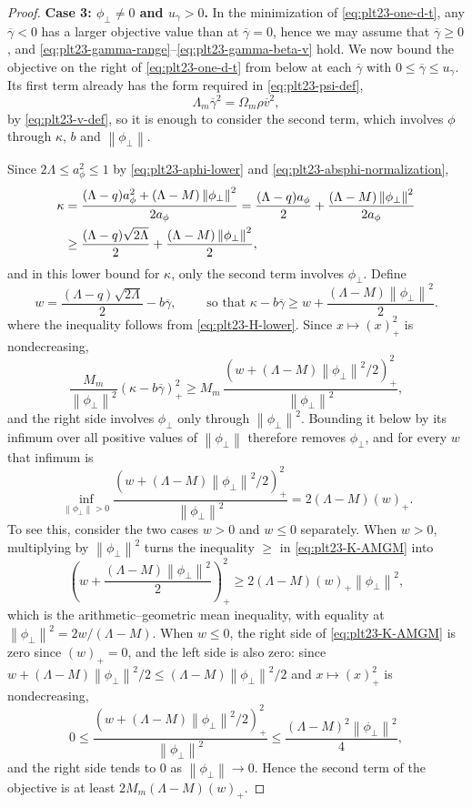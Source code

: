 ﻿\documentclass[11pt]{article}
\numberwithin{equation}{section}
\newcommand{\norm}[1]{\left\lVert #1\right\rVert}
\newcommand{\pos}[1]{\left(#1\right)_{+}}
\begin{document}
\begin{proof}
  \textbf{Case 3: $\phi_\perp\ne0$ and $u_\gamma>0$.}
  In the minimization of \eqref{eq:plt23-one-d-t}, any $\overline\gamma<0$ has a larger objective value than at $\overline\gamma=0$, hence we may assume that $\overline\gamma\ge0$, and \eqref{eq:plt23-gamma-range}--\eqref{eq:plt23-gamma-beta-v} hold.
  We now bound the objective on the right of \eqref{eq:plt23-one-d-t} from below at each $\overline\gamma$ with $0\le\overline\gamma\le u_\gamma$.
  Its first term already has the form required in \eqref{eq:plt23-psi-def},
  \[
    \Lambda_m\overline\gamma^2=\Omega_m\rho\overline v^2,
  \]
  by \eqref{eq:plt23-v-def}, so it is enough to consider the second term, which involves $\phi$ through $\kappa$, $b$ and $\norm{\phi_\perp}$.

  Since $2\Lambda\le a_\phi^2\le1$ by \eqref{eq:plt23-aphi-lower} and \eqref{eq:plt23-absphi-normalization},
  \begin{align}
    \kappa
    &=\frac{(\Lambda-q)a_\phi^2+(\Lambda-M)\norm{\phi_\perp}^2}{2a_\phi}
    =\frac{(\Lambda-q)a_\phi}{2}+\frac{(\Lambda-M)\norm{\phi_\perp}^2}{2a_\phi}\notag\\
    &\ge\frac{(\Lambda-q)\sqrt{2\Lambda}}{2}
    +\frac{(\Lambda-M)\norm{\phi_\perp}^2}{2},\label{eq:plt23-H-lower}
  \end{align}
  and in this lower bound for $\kappa$, only the second term involves $\phi_\perp$.
  Define
  \[
    w=\frac{(\Lambda-q)\sqrt{2\Lambda}}{2}-b\overline\gamma, \qquad \text{ so that } \kappa-b\overline\gamma\ge w+ \frac{(\Lambda-M)\norm{\phi_\perp}^2}{2}.
  \]
  where the inequality follows from \eqref{eq:plt23-H-lower}.
  Since $x\mapsto\pos x^2$ is nondecreasing,
  \[
    \frac{M_m}{\norm{\phi_\perp}^2}\pos{\kappa-b\overline\gamma}^2
    \ge M_m\,\frac{\pos{w+(\Lambda-M)\norm{\phi_\perp}^2/2}^2}{\norm{\phi_\perp}^2},
  \]
  and the right side involves $\phi_\perp$ only through $\norm{\phi_\perp}^2$.
  Bounding it below by its infimum over all positive values of $\norm{\phi_\perp}$ therefore removes $\phi_\perp$, and for every $w$ that infimum is
  \begin{equation}\label{eq:plt23-K-AMGM}
    \inf_{\norm{\phi_\perp}>0}
    \frac{\pos{w+(\Lambda-M)\norm{\phi_\perp}^2/2}^2}{\norm{\phi_\perp}^2}
    =2(\Lambda-M)\pos w.
  \end{equation}
  To see this, consider the two cases $w>0$ and $w\le0$ separately.
  When $w>0$, multiplying by $\norm{\phi_\perp}^2$ turns the inequality $\ge$ in \eqref{eq:plt23-K-AMGM} into
  \[
    \pos{w+\frac{(\Lambda-M)\norm{\phi_\perp}^2}{2}}^2
    \ge2(\Lambda-M)\pos w\norm{\phi_\perp}^2,
  \]
  which is the arithmetic--geometric mean inequality, with equality at $\norm{\phi_\perp}^2=2w/(\Lambda-M)$.
  When $w\le0$, the right side of \eqref{eq:plt23-K-AMGM} is zero since $\pos w=0$, and the left side is also zero: since $w+(\Lambda-M)\norm{\phi_\perp}^2/2\le(\Lambda-M)\norm{\phi_\perp}^2/2$ and $x\mapsto\pos x^2$ is nondecreasing,
  \[
    0\le\frac{\pos{w+(\Lambda-M)\norm{\phi_\perp}^2/2}^2}{\norm{\phi_\perp}^2}
    \le\frac{(\Lambda-M)^2\norm{\phi_\perp}^2}{4},
  \]
  and the right side tends to $0$ as $\norm{\phi_\perp}\to0$.
  Hence the second term of the objective is at least $2M_m(\Lambda-M)\pos w$.


\end{proof}
\end{document}
